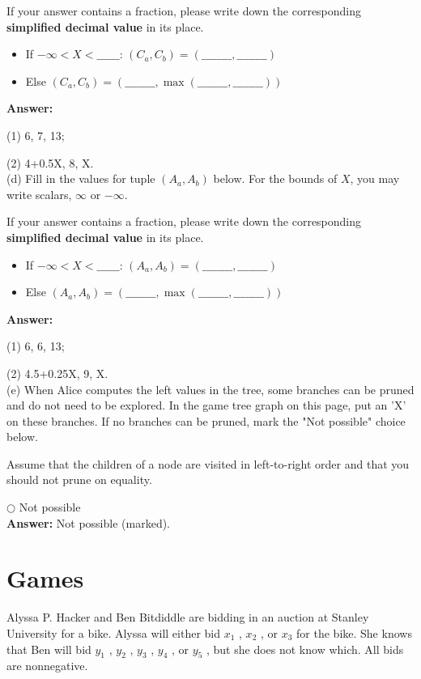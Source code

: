 \documentclass{article}
\begin{document}
\noindent If your answer contains a fraction, please write down the corresponding \textbf{simplified decimal value} in its place.

\begin{itemize}
  \item If $-\infty < X < \_\_\_\_\_\_$: $(C_a , C_b) = (\_\_\_\_\_\_\_\_,\_\_\_\_\_\_\_\_)$
  \item Else $(C_a , C_b) = (\_\_\_\_\_\_\_\_,  \max(\_\_\_\_\_\_\_\_,\_\_\_\_\_\_\_\_) )$
\end{itemize}

\textbf{Answer:} 

(1) 6, 7, 13;

(2) 4+0.5X, 8, X. \\

\noindent (d) Fill in the values for tuple $(A_a , A_b)$ below. For the bounds of $X$, you may write scalars, $\infty$ or $-\infty$.

\noindent If your answer contains a fraction, please write down the corresponding \textbf{simplified decimal value} in its place.

\begin{itemize}
  \item If $-\infty < X < \_\_\_\_\_\_$: $(A_a , A_b) = (\_\_\_\_\_\_\_\_,\_\_\_\_\_\_\_\_)$
  \item Else $(A_a , A_b) = (\_\_\_\_\_\_\_\_,  \max(\_\_\_\_\_\_\_\_,\_\_\_\_\_\_\_\_) )$
\end{itemize}

\textbf{Answer:}

(1) 6, 6, 13;

(2) 4.5+0.25X, 9, X. \\

\noindent (e) When Alice computes the left values in the tree, some branches can be pruned and do not need to be explored. In the game tree graph on this page, put an ’X’ on these branches. If no branches can be pruned, mark the "Not possible" choice below.

\noindent Assume that the children of a node are visited in left-to-right order and that you should not prune on equality.

$\bigcirc $ Not possible \\

\textbf{Answer:} Not possible (marked).

\newpage
\section{Games}
Alyssa P. Hacker and Ben Bitdiddle are bidding in an auction at Stanley University for a bike. Alyssa will either bid $x_1$ , $x_2$ , or $x_3$ for the bike. She knows that Ben will bid $y_1$ , $y_2$ , $y_3$ , $y_4$ , or $y_5$ , but she does not know which. All bids are nonnegative.
\end{document}
